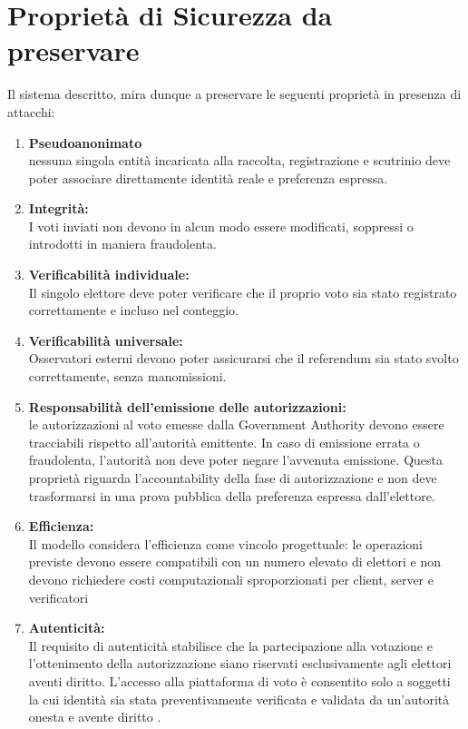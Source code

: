 \documentclass[a4paper,12pt]{article}
\begin{document}
\section{Proprietà di Sicurezza da preservare}
    Il sistema descritto, mira dunque a preservare le seguenti proprietà in presenza di attacchi:
    \begin{enumerate}
        \item \textbf{Pseudoanonimato}\\ nessuna singola entità  incaricata alla raccolta, registrazione e scutrinio deve poter associare direttamente identità reale e preferenza espressa. 
        \item \textbf{Integrità:} \\ I voti inviati non devono in alcun modo essere modificati, soppressi o introdotti in maniera fraudolenta.
        \item \textbf{Verificabilità individuale:}\\ Il singolo elettore deve poter verificare che il proprio voto sia stato registrato correttamente e incluso nel conteggio.
        \item \textbf{Verificabilità universale:}\\ Osservatori esterni devono poter assicurarsi che il referendum sia stato svolto correttamente, senza manomissioni.
        \item \textbf{Responsabilità dell'emissione delle autorizzazioni:}\\ le autorizzazioni al voto emesse dalla Government Authority devono essere tracciabili rispetto all'autorità emittente.
        In caso di emissione errata o fraudolenta, l'autorità non deve poter negare l'avvenuta emissione. Questa proprietà riguarda l'accountability della fase di autorizzazione e non deve trasformarsi in una prova pubblica della preferenza espressa dall'elettore.
        \item \textbf{Efficienza:} \\Il modello considera l’efficienza come vincolo progettuale: le operazioni previste devono essere compatibili con un numero elevato di elettori e non devono richiedere costi computazionali sproporzionati per client, server e verificatori 
        \item \textbf{Autenticità:}\\Il requisito di autenticità stabilisce che la partecipazione alla votazione e l'ottenimento della autorizzazione siano riservati esclusivamente agli elettori aventi diritto.
        L'accesso alla piattaforma di voto è consentito solo a soggetti la cui identità sia stata preventivamente verificata e validata da un'autorità onesta e avente diritto .

\end{enumerate}
\end{document}
